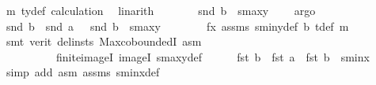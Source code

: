\begin{isabellebody}
\ m{}{\isacharparenleft}{\kern0pt}{}{\isacharparenright}{\kern0pt}\ ty{}{\isacharunderscore}{\kern0pt}def\ calculation\ \isamarkupfalse%
\ linarith\isanewline
\ \ \ \ \isamarkupfalse%
\ \isamarkupfalse%
\ {}{\isacharcolon}{\kern0pt}{\isachardoublequoteopen}snd\ b\ {\isacharminus}{\kern0pt}\ s{}{\isacharunderscore}{\kern0pt}maxy\ {\isasymge}\ {}{\isachardoublequoteclose}\ \isamarkupfalse%
\ argo\isanewline
\isanewline
\ \ \ \ \isamarkupfalse%
\ {}{\isacharcolon}{\kern0pt}{\isachardoublequoteopen}snd\ b\ {\isacharminus}{\kern0pt}\ snd\ a\ \ {\isasymge}\ snd\ b\ {\isacharminus}{\kern0pt}\ {\isacharparenleft}{\kern0pt}s{}{\isacharunderscore}{\kern0pt}maxy{\isacharparenright}{\kern0pt}{\isachardoublequoteclose}\isanewline
\ \ \ \ \ \ \isamarkupfalse%
\ fx\ assms\ s{}{\isacharunderscore}{\kern0pt}miny{\isacharunderscore}{\kern0pt}def\ b{}{\isacharparenleft}{\kern0pt}{}{\isacharparenright}{\kern0pt}\ t{\isacharunderscore}{\kern0pt}def\ m{}{\isacharparenleft}{\kern0pt}{}{\isacharparenright}{\kern0pt}\isanewline
\ \ \ \ \ \ \isamarkupfalse%
\ {\isacharparenleft}{\kern0pt}smt\ {\isacharparenleft}{\kern0pt}verit{\isacharcomma}{\kern0pt}\ del{\isacharunderscore}{\kern0pt}insts{\isacharparenright}{\kern0pt}\ Max{\isachardot}{\kern0pt}coboundedI\ asm{\isacharparenleft}{\kern0pt}{}{\isacharparenright}{\kern0pt}\isanewline
\ \ \ \ \ \ \ \ \ \ finite{\isacharunderscore}{\kern0pt}imageI\ imageI\ s{}{\isacharunderscore}{\kern0pt}maxy{\isacharunderscore}{\kern0pt}def{\isacharparenright}{\kern0pt}\isanewline
\ \ \ \ \isamarkupfalse%
\ {}{\isacharcolon}{\kern0pt}{\isachardoublequoteopen}fst\ b\ {\isacharminus}{\kern0pt}\ fst\ a\ {\isasymle}\ fst\ b\ {\isacharminus}{\kern0pt}\ {\isacharparenleft}{\kern0pt}s{}{\isacharunderscore}{\kern0pt}minx{\isacharparenright}{\kern0pt}{\isachardoublequoteclose}\ \ \isamarkupfalse%
\ {\isacharparenleft}{\kern0pt}simp\ add{\isacharcolon}{\kern0pt}\ asm{\isacharparenleft}{\kern0pt}{}{\isacharparenright}{\kern0pt}\ assms{\isacharparenleft}{\kern0pt}{}{\isacharparenright}{\kern0pt}\ s{}{\isacharunderscore}{\kern0pt}minx{\isacharunderscore}{\kern0pt}def{\isacharparenright}{\kern0pt}\isanewline
\ \ \ \ \isamarkupfalse%

\end{isabellebody}
